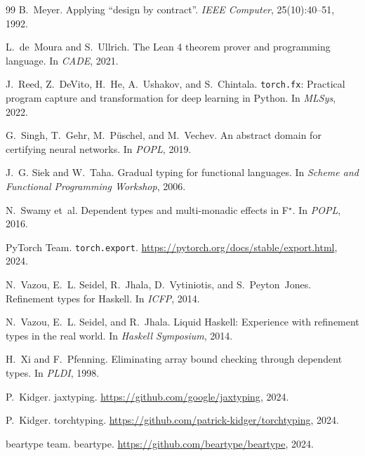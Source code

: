 \begin{thebibliography}{99}
B.~Meyer.
\newblock Applying ``design by contract''.
\newblock \emph{IEEE Computer}, 25(10):40--51, 1992.

L.~de~Moura and S.~Ullrich.
\newblock The Lean 4 theorem prover and programming language.
\newblock In \emph{CADE}, 2021.

J.~Reed, Z.~DeVito, H.~He, A.~Ushakov, and S.~Chintala.
\newblock \texttt{torch.fx}: Practical program capture and
  transformation for deep learning in Python.
\newblock In \emph{MLSys}, 2022.

G.~Singh, T.~Gehr, M.~P\"uschel, and M.~Vechev.
\newblock An abstract domain for certifying neural networks.
\newblock In \emph{POPL}, 2019.

J.~G. Siek and W.~Taha.
\newblock Gradual typing for functional languages.
\newblock In \emph{Scheme and Functional Programming Workshop}, 2006.

N.~Swamy et~al.
\newblock Dependent types and multi-monadic effects in F$^\star$.
\newblock In \emph{POPL}, 2016.

PyTorch Team.
\newblock \texttt{torch.export}.
\newblock \url{https://pytorch.org/docs/stable/export.html}, 2024.

N.~Vazou, E.~L. Seidel, R.~Jhala, D.~Vytiniotis, and S.~Peyton~Jones.
\newblock Refinement types for Haskell.
\newblock In \emph{ICFP}, 2014.

N.~Vazou, E.~L. Seidel, and R.~Jhala.
\newblock Liquid Haskell: Experience with refinement types in the
  real world.
\newblock In \emph{Haskell Symposium}, 2014.

H.~Xi and F.~Pfenning.
\newblock Eliminating array bound checking through dependent types.
\newblock In \emph{PLDI}, 1998.

P.~Kidger.
\newblock jaxtyping.
\newblock \url{https://github.com/google/jaxtyping}, 2024.

P.~Kidger.
\newblock torchtyping.
\newblock \url{https://github.com/patrick-kidger/torchtyping}, 2024.

beartype team.
\newblock beartype.
\newblock \url{https://github.com/beartype/beartype}, 2024.

\end{thebibliography}
